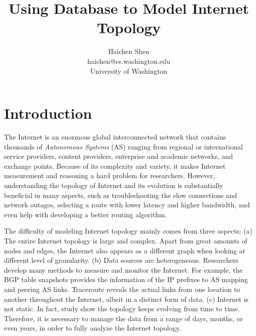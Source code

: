 \documentclass[letterpaper,twocolumn,11pt]{article}
\author{\rm Haichen Shen\\ 
       haichen@cs.washington.edu \\
       University of Washington \\
       }
\date{}
\begin{document}
\title{Using Database to Model Internet Topology}
\maketitle

\section{Introduction}


The Internet is an enormous global interconnected network that contains thousands of {\it Autonomous Systems} (AS) ranging from regional or international service providers, content providers, enterprise and academic networks, and exchange points. Because of its complexity and variety, it makes Internet measurement and reasoning a hard problem for researchers. However, understanding the topology of Internet and its evolution is substantially beneficial in many aspects, such as troubleshooting the slow connections and network outages, selecting a route with lower latency and higher bandwidth, and even help with developing a better routing algorithm.

The difficulty of modeling Internet topology mainly comes from three aspects: (a) The entire Internet topology is large and complex. Apart from great amounts of nodes and edges, the Internet also appears as a different graph when looking at different level of granularity. (b) Data sources are heterogeneous. Researchers develop many methods to measure and monitor the Internet. For example, the BGP table snapshots provides the information of the IP prefixes to AS mapping and peering AS links. Traceroute reveals the actual links from one location to another throughout the Internet, albeit in a distinct form of data. (c) Internet is not static. In fact, study \cite{zegura1997quantitative} \cite{edwards2012internet} show the topology keeps evolving from time to time. Therefore, it is necessary to manage the data from a range of days, months, or even years, in order to fully analyze the Internet topology.
\end{document}
